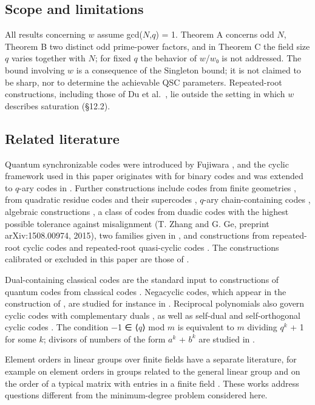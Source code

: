 \documentclass[pdflatex,sn-mathphys-num]{sn-jnl}
\theoremstyle{thmstyleone}
\theoremstyle{thmstylethree}
\begin{document}
\subsection{Scope and limitations}

All results concerning \(w\) assume gcd(\(N\),\(q\)) = 1. Theorem A concerns odd \(N\), Theorem B two distinct odd prime-power factors, and in Theorem C the field size \(q\) varies together with \(N\); for fixed \(q\) the behavior of \(w\)/\(w\)₀ is not addressed. The bound involving \(w\) is a consequence of the Singleton bound; it is not claimed to be sharp, nor to determine the achievable QSC parameters. Repeated-root constructions, including those of Du et al.~\cite{DMLHW20}, lie outside the setting in which \(w\) describes saturation (§12.2).

\subsection{Related literature}

Quantum synchronizable codes were introduced by Fujiwara \cite{Fuj13}, and the cyclic framework used in this paper originates with \cite{FTW} for binary codes and was extended to \(q\)-ary codes in \cite{XYY16,LM18}. Further constructions include codes from finite geometries \cite{FV14}, from quadratic residue codes and their supercodes \cite{XYF14}, \(q\)-ary chain-containing codes \cite{XYY16}, algebraic constructions \cite{GLG17}, a class of codes from duadic codes with the highest possible tolerance against misalignment (T. Zhang and G. Ge, preprint arXiv:1508.00974, 2015), two families given in \cite{LML19}, and constructions from repeated-root cyclic codes \cite{LM18} and repeated-root quasi-cyclic codes \cite{DML23}. The constructions calibrated or excluded in this paper are those of \cite{LZ22,DMLHW20}.

Dual-containing classical codes are the standard input to constructions of quantum codes from classical codes \cite{CRSS98,KKKS06,AKS07}. Negacyclic codes, which appear in the construction of \cite{LZ22}, are studied for instance in \cite{Bla08,KZ13}. Reciprocal polynomials also govern cyclic codes with complementary duals \cite{Mas92,YM94}, as well as self-dual and self-orthogonal cyclic codes \cite{ST,JLX}. The condition −1 ∈ ⟨\(q\)⟩ mod \(m\) is equivalent to \(m\) dividing \(q^k\) + 1 for some \(k\); divisors of numbers of the form \(a^k\) + \(b^k\) are studied in \cite{Mor97}.

Element orders in linear groups over finite fields have a separate literature, for example on element orders in groups related to the general linear group \cite{Dar05} and on the order of a typical matrix with entries in a finite field \cite{Sch95}. These works address questions different from the minimum-degree problem considered here.
\end{document}
